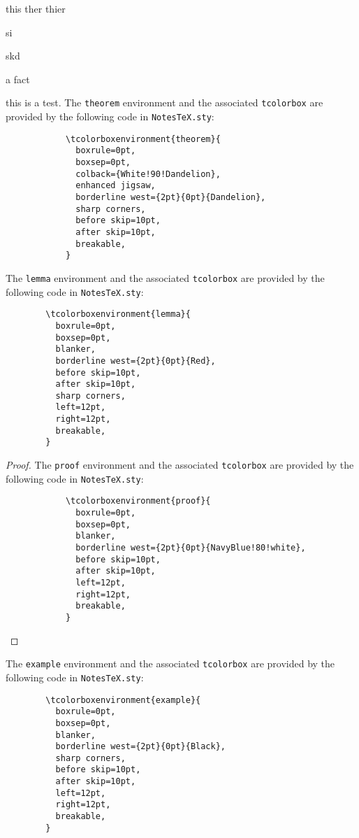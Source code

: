 \documentclass[10pt]{article}
\begin{document}
	\begin{prob}
	this ther
	thier 

	si 

	skd
	\end{prob}

	\begin{fact}
		a fact
	\end{fact}
	\begin{theorem}
this is a test.		The \texttt{theorem} environment and the associated \texttt{tcolorbox} are provided by the following code in \texttt{NotesTeX.sty}:
		\begin{verbatim}
			\tcolorboxenvironment{theorem}{
			  boxrule=0pt,
			  boxsep=0pt,
			  colback={White!90!Dandelion},
			  enhanced jigsaw, 
			  borderline west={2pt}{0pt}{Dandelion},
			  sharp corners,
			  before skip=10pt,
			  after skip=10pt,
			  breakable,
			}
		\end{verbatim}
	\end{theorem}
	\begin{lemma}
		The \texttt{lemma} environment and the associated \texttt{tcolorbox} are provided by the following code in \texttt{NotesTeX.sty}:
		\begin{verbatim}
		\tcolorboxenvironment{lemma}{
		  boxrule=0pt,
		  boxsep=0pt,
		  blanker,
		  borderline west={2pt}{0pt}{Red},
		  before skip=10pt,
		  after skip=10pt,
		  sharp corners,
		  left=12pt,
		  right=12pt,
		  breakable,
		}
		\end{verbatim}
	\end{lemma}
	\begin{proof}
		The \texttt{proof} environment and the associated \texttt{tcolorbox} are provided by the following code in \texttt{NotesTeX.sty}:
		\begin{verbatim}
			\tcolorboxenvironment{proof}{
			  boxrule=0pt,
			  boxsep=0pt,
			  blanker,
			  borderline west={2pt}{0pt}{NavyBlue!80!white},
			  before skip=10pt,
			  after skip=10pt,
			  left=12pt,
			  right=12pt,
			  breakable,
			}
		\end{verbatim}
	\end{proof}
	\begin{example}
		The \texttt{example} environment and the associated \texttt{tcolorbox} are provided by the following code in \texttt{NotesTeX.sty}:
		\begin{verbatim}	
		\tcolorboxenvironment{example}{
		  boxrule=0pt,
		  boxsep=0pt,
		  blanker,
		  borderline west={2pt}{0pt}{Black},
		  sharp corners,
		  before skip=10pt,
		  after skip=10pt,
		  left=12pt,
		  right=12pt,
		  breakable,
		}
		\end{verbatim}
	\end{example}	
\end{document}
